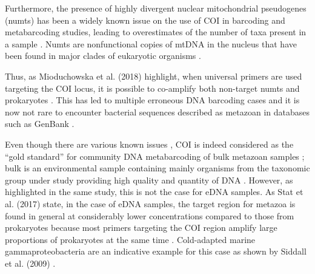    Furthermore, the presence of highly divergent nuclear mitochondrial pseudogenes (numts) has been a widely known issue on the use of COI in barcoding and metabarcoding studies, leading to overestimates of the number of taxa present in a sample \citep{song2008many}.
   Numts are nonfunctional copies of mtDNA in the nucleus that have been found in major clades of eukaryotic organisms \citep{bensasson2001mitochondrial}.

   Thus, as Mioduchowska et al. (2018) \citep{mioduchowska2018instances} highlight, when universal primers are used targeting the COI locus, it is possible to co-amplify both non-target numts and prokaryotes \citep{siddall2009barcoding}. This has led to multiple erroneous DNA barcoding cases and it is now not rare to encounter bacterial sequences described as metazoan in databases such as GenBank \citep{mioduchowska2018instances}.



   Even though there are various known issues \citep{deagle2014dna}, COI is indeed considered as the “gold standard” for community DNA metabarcoding of bulk metazoan samples \citep{andujar2018coi}; 
   bulk is an environmental sample containing mainly organisms from the taxonomic group under study providing high quality and quantity of DNA \citep{taberletanalysis}. 
   However, as highlighted in the same study, this is not the case for eDNA samples. 
   As Stat et al. (2017) \citep{stat2017ecosystem} state, in the case of eDNA samples, the target region for metazoa is found in general at considerably lower concentrations compared to those from prokaryotes because most primers targeting the COI region amplify large proportions of prokaryotes at the same time \citep{yang2013testing, yang2014using, collins2019non}. 
   Cold-adapted marine gammaproteobacteria are an indicative example for this case as shown by Siddall et al. (2009) \citep{siddall2009barcoding}.



